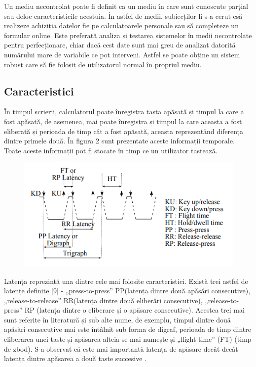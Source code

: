 \documentclass[9pt,shortpaper,twoside,web]{ieeecolor}
\begin{document}
	Un mediu necontrolat poate fi definit ca un mediu în care sunt cunoscute parțial sau deloc caracteristicile acestuia. În astfel de medii, subiecților li s-a cerut esă realizeze achiziția datelor fie pe calculatoarele personale sau să completeze un formular online. Este preferată analiza și testarea sistemelor în medii necontrolate pentru perfecționare, chiar dacă cest date sunt mai greu de analizat datorită numărului mare de variabile ce pot interveni. Astfel se poate obține un sistem robust care să fie folosit de utilizatorul normal în propriul mediu.
	
	
\subsection{Caracteristici}
	În timpul scrierii, calculatorul poate înregistra tasta apăsată și timpul la care a fost apăsată, de asemenea, mai poate înregistra și timpul la care aceasta a fost eliberată și perioada de timp cât a fost apăsată, aceasta reprezentând diferența dintre primele două. În figura 2 sunt prezentate aceste informații temporale. Toate aceste informații pot fi stocate în timp ce un utilizator tastează.
	
\begin{figure}[htb]
\includegraphics[width=0.9\columnwidth]{res/fig/keystroke-timing-information}
\caption{ \cite{b3}}
\label{fig2}
\end{figure}

	Latența reprezintă una dintre cele mai folosite caracteristici. Există trei astfel de latențe definite [9] - „press-to-press” PP(latența dintre două apăsări consecutive), „release-to-release” RR(latența dintre două eliberări consecutive), „release-to-press” RP (latența dintre o eliberare și o apăsare consecutive). Acestea trei mai sunt referite în literatură și sub alte nume, de exemplu, timpul dintre două apăsări consecutive mai este întâlnit sub forma de digraf, perioada de timp dintre eliberarea unei taste și apăsarea alteia se mai numește și „flight-time” (FT) (timp de zbod). S-a observat că este mai importantă latența de apăsare decât decât latența dintre apăsarea a două taste succesive \cite{b3}. 
		
\end{document}
